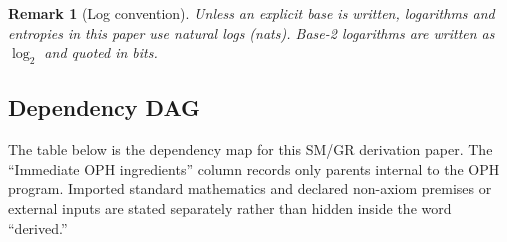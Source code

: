 \documentclass[11pt]{article}
\newtheorem{remark}[theorem]{Remark}
\begin{document}
\begin{remark}[Log convention]
Unless an explicit base is written, logarithms and entropies in this paper use natural logs (nats). Base-2 logarithms are written as \(\log_2\) and quoted in bits.
\end{remark}

\subsection*{Dependency DAG}

The table below is the dependency map for this SM/GR derivation paper. The ``Immediate OPH ingredients'' column records only parents internal to the OPH program. Imported standard mathematics and declared non-axiom premises or external inputs are stated separately rather than hidden inside the word ``derived.''
\end{document}
